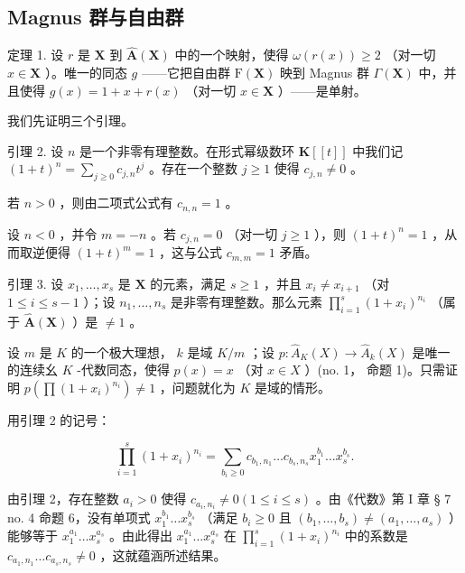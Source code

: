 \subsection{Magnus 群与自由群}

定理 1. 设 \(r\) 是 \(\mathbf{X}\) 到 \(\hat{\mathbf{A}}(\mathbf{X})\) 中的一个映射，使得 \(\omega(r(x)) \geqslant 2\) （对一切 \(x \in \mathbf{X}\) ）。唯一的同态 \(g\) ——它把自由群 \(\mathrm{F}(\mathbf{X})\) 映到 Magnus 群 \(\Gamma(\mathbf{X})\) 中，并且使得 \(g(x) = 1 + x + r(x)\) （对一切 \(x \in \mathbf{X}\) ）——是单射。

我们先证明三个引理。

引理 2. 设 \(n\) 是一个非零有理整数。在形式幂级数环 \(\mathbf{K}[[t]]\) 中我们记 \((1 + t)^n = \sum_{j \geqslant 0} c_{j,n} t^j\) 。存在一个整数 \(j \geqslant 1\) 使得 \(c_{j,n} \neq 0\) 。

若 \(n > 0\) ，则由二项式公式有 \(c_{n,n} = 1\) 。

设 \(n < 0\) ，并令 \(m = -n\) 。若 \(c_{j,n} = 0\) （对一切 \(j \geqslant 1\) ），则 \((1 + t)^n = 1\) ，从而取逆便得 \((1 + t)^m = 1\) ，这与公式 \(c_{m,m} = 1\) 矛盾。

引理 3. 设 \(x_1, \ldots, x_s\) 是 \(\mathbf{X}\) 的元素，满足 \(s \geqslant 1\) ，并且 \(x_i \neq x_{i+1}\) （对 \(1 \leqslant i \leqslant s-1\) ）；设 \(n_1, \ldots, n_s\) 是非零有理整数。那么元素 \(\prod_{i=1}^{s} (1 + x_i)^{n_i}\) （属于 \(\hat{\mathbf{A}}(\mathbf{X})\) ）是 \(\neq 1\) 。

设 \(m\) 是 \(K\) 的一个极大理想， \(k\) 是域 \(K/m\) ；设 \(p: \hat{A}_K(X) \to \hat{A}_k(X)\) 是唯一的连续幺 \(K\) -代数同态，使得 \(p(x) = x\) （对 \(x \in X\) ）(no. 1， 命题 1)。只需证明 \(p\left(\prod (1 + x_i)^{n_i}\right) \neq 1\) ，问题就化为 \(K\) 是域的情形。

用引理 2 的记号：

\[
\prod_ {i = 1} ^ {s} (1 + x _ {i}) ^ {n _ {i}} = \sum_ {b _ {i} \geqslant 0} c _ {b _ {1}, n _ {1}} \dots c _ {b _ {s}, n _ {s}} x _ {1} ^ {b _ {1}} \dots x _ {s} ^ {b _ {s}}.
\]

由引理 2，存在整数 \(a_i > 0\) 使得 \(c_{a_i, n_i} \neq 0 (1 \leqslant i \leqslant s)\) 。由《代数》第 I 章 § 7 no. 4 命题 6，没有单项式 \(x_1^{b_1} \ldots x_s^{b_s}\) （满足 \(b_{i} \geqslant 0\) 且 \((b_{1}, \ldots, b_{s}) \neq (a_{1}, \ldots, a_{s})\) ）能够等于 \(x_{1}^{a_{1}} \ldots x_{s}^{a_{s}}\) 。由此得出 \(x_{1}^{a_{1}} \ldots x_{s}^{a_{s}}\) 在 \(\prod_{i=1}^{s} (1 + x_{i})^{n_{i}}\) 中的系数是 \(c_{a_{1}, n_{1}} \ldots c_{a_{s}, n_{s}} \neq 0\) ，这就蕴涵所述结果。

